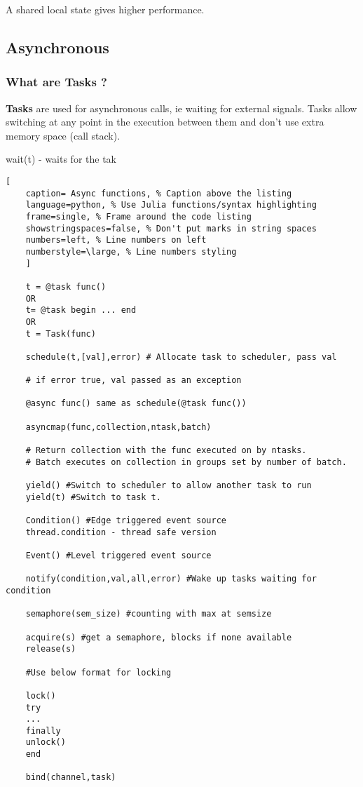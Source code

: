 \documentclass[11pt]{scrartcl} %
\begin{document}
A shared local state gives higher performance.

\subsection{Asynchronous}

\subsubsection{What are Tasks ?}

\textbf{Tasks} are used for asynchronous calls, ie waiting for external signals. Tasks allow switching at any
point in the execution between them and don't use extra memory space (call stack).

wait(t) - waits for the tak
\begin{lstlisting}[
	caption= Async functions, % Caption above the listing
	language=python, % Use Julia functions/syntax highlighting
	frame=single, % Frame around the code listing
	showstringspaces=false, % Don't put marks in string spaces
	numbers=left, % Line numbers on left
	numberstyle=\large, % Line numbers styling
	]

	t = @task func()
	OR
	t= @task begin ... end
	OR	
	t = Task(func)

	schedule(t,[val],error) # Allocate task to scheduler, pass val

	# if error true, val passed as an exception

	@async func() same as schedule(@task func())

	asyncmap(func,collection,ntask,batch) 
	
	# Return collection with the func executed on by ntasks.
	# Batch executes on collection in groups set by number of batch.

	yield() #Switch to scheduler to allow another task to run
	yield(t) #Switch to task t.

	Condition() #Edge triggered event source
	thread.condition - thread safe version

	Event() #Level triggered event source

	notify(condition,val,all,error) #Wake up tasks waiting for condition

	semaphore(sem_size) #counting with max at semsize

	acquire(s) #get a semaphore, blocks if none available
	release(s)

	#Use below format for locking

	lock()
	try
	...
	finally
	unlock()
	end

	bind(channel,task) 

\end{lstlisting}
\end{document}
